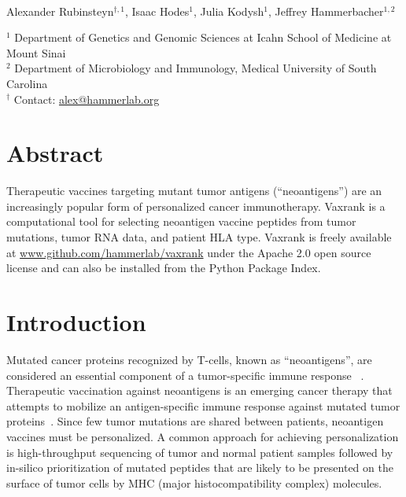 \documentclass[10pt,letterpaper]{article}
\begin{document}
\vspace*{0.35in}

\begin{flushleft}
{\Large
\textbf{}
}
\newline
\\
Alexander Rubinsteyn$^{\dagger,1}$,
Isaac Hodes$^1$,
Julia Kodysh$^1$,
Jeffrey Hammerbacher$^{1,2}$
\\
\bigskip

	$^1$ Department of Genetics and Genomic Sciences at Icahn School of Medicine at Mount Sinai \\
    $^2$ Department of Microbiology and Immunology, Medical University of South Carolina \\
	$^\dagger$ Contact: \href{alex@hammerlab.org}{alex@hammerlab.org} \\


\end{flushleft}

\section*{Abstract}
	Therapeutic vaccines targeting mutant tumor antigens (``neoantigens'') are an increasingly popular form of personalized cancer immunotherapy. Vaxrank is a computational tool for selecting neoantigen vaccine peptides from tumor mutations, tumor RNA data, and patient HLA type.  Vaxrank is freely available at \href{https://www.github.com/hammerlab/vaxrank}{www.github.com/hammerlab/vaxrank} under the Apache  2.0 open source license and can also be installed from the Python Package Index.



\section{Introduction}


Mutated cancer proteins recognized by T-cells, known as ``neoantigens'', are considered an essential component of a tumor-specific immune response ~\citep{neoantigens-finnigan, neoantigens-schumacher, neoantigens-gubin}. Therapeutic vaccination against neoantigens is an emerging cancer therapy that attempts to mobilize an antigen-specific immune response against mutated tumor proteins~\citep{neovax-sharma, neovax-sahin}. Since few tumor mutations are shared between patients, neoantigen vaccines must be personalized. A common approach for achieving personalization is high-throughput sequencing of tumor and normal patient samples followed by in-silico prioritization of mutated peptides that are likely to be presented on the surface of tumor cells by MHC (major histocompatibility complex) molecules.
\end{document}
